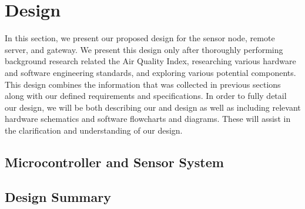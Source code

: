 \section{Design}
In this section, we present our proposed design for the sensor node, remote server, and gateway. We present this design only after thoroughly performing background research related the Air Quality Index, researching various hardware and software engineering standards, and exploring various potential components. This design combines the information that was collected in previous sections along with our defined requirements and specifications. In order to fully detail our design, we will be both describing our and design as well as including relevant hardware schematics and software flowcharts and diagrams. These will assist in the clarification and understanding of our design.


\subsection{Microcontroller and Sensor System}


\subsection{Design Summary}

